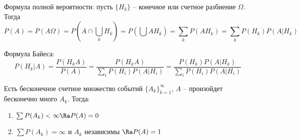 Формула полной вероятности: пусть $\{H_k\}$ -- конечное или счетное разбиение $\Omega$. Тогда
$$ P(A) = P(A\Omega) = P(A \cap \bigcup\limits_k H_k) = P(\bigcup AH_k) = \sum\limits_k P(AH_k) = \sum\limits_k P(H_k) P(A | H_k)$$


Формула Байеса: 
$$ P(H_k | A) = \frac{P(H_k A)}{P(A)} = \frac{P(H_k A)}{\sum\limits_i P(H_i) P(A | H_i)} = \frac{P(H_k) P(A | H_k)}{\sum\limits_i P(H_i) P(A | H_i)}$$

\begin{lemma}
Есть бесконечное счетное множество событий $\{A_k\}_{k=1}^{\infty}$, $A$ -- произойдет бесконечно много $A_k$. Тогда:
\begin{enumerate}
    \item $\sum P(A_k) < \infty \Ra P(A) = 0$
    \item $\sum P(A_k) = \infty$ и $A_k$ независимы $\Ra P(A) = 1$
\end{enumerate}    
\end{lemma}
